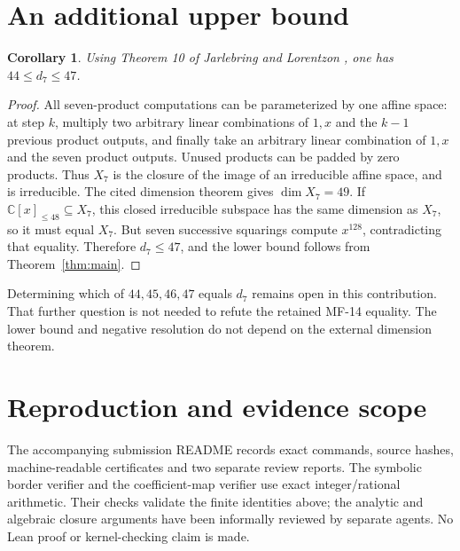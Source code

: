 \documentclass[11pt]{article}
\newtheorem{corollary}[theorem]{Corollary}
\newcommand{\C}{\mathbb C}
\newcommand{\V}[1]{\C[x]_{\le #1}}
\begin{document}
\section{An additional upper bound}
\begin{corollary}\label{cor:bounds}
Using Theorem 10 of Jarlebring and Lorentzon \cite{JL}, one has
$44\le d_7\le47$.
\end{corollary}
\begin{proof}
All seven-product computations can be parameterized by one affine space:
at step $k$, multiply two arbitrary linear combinations of $1,x$ and the
$k-1$ previous product outputs, and finally take an arbitrary linear
combination of $1,x$ and the seven product outputs. Unused products can be
padded by zero products. Thus $X_7$ is the closure of the image of an
irreducible affine space, and is irreducible. The cited dimension theorem
gives $\dim X_7=49$. If $\V{48}\subseteq X_7$, this closed irreducible
subspace has the same dimension as $X_7$, so it must equal $X_7$.
But seven successive squarings compute $x^{128}$, contradicting that
equality. Therefore $d_7\le47$, and the lower bound follows from
Theorem~\ref{thm:main}.
\end{proof}
Determining which of $44,45,46,47$ equals $d_7$ remains open in this
contribution. That further question is not needed to refute the retained
MF-14 equality. The lower bound and negative resolution do not depend on
the external dimension theorem.

\section{Reproduction and evidence scope}
The accompanying submission README records exact commands, source hashes,
machine-readable certificates and two separate review reports. The symbolic
border verifier and the coefficient-map verifier use exact integer/rational
arithmetic. Their checks validate the finite identities above; the analytic
and algebraic closure arguments have been informally reviewed by separate
agents. No Lean proof or kernel-checking claim is made.

\appendix
\end{document}
